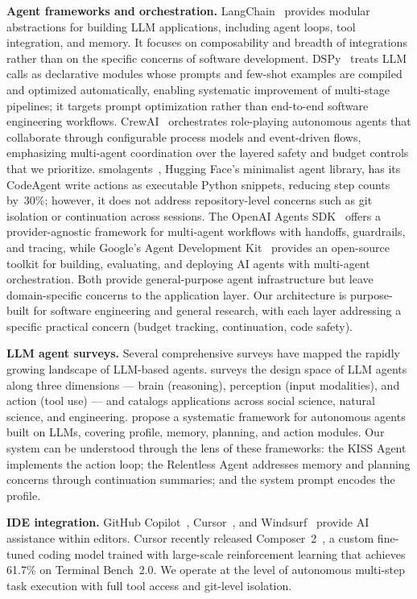 \documentclass{article}
\begin{document}
\textbf{Agent frameworks and orchestration.} LangChain~\citep{langchain2022} provides modular abstractions for building LLM applications, including agent loops, tool integration, and memory. It focuses on composability and breadth of integrations rather than on the specific concerns of software development.  DSPy~\citep{khattab2024dspy} treats LLM calls as declarative modules whose prompts and few-shot examples are compiled and optimized automatically, enabling systematic improvement of multi-stage pipelines; it targets prompt optimization rather than end-to-end software engineering workflows.  CrewAI~\citep{crewai2024} orchestrates role-playing autonomous agents that collaborate through configurable process models and event-driven flows, emphasizing multi-agent coordination over the layered safety and budget controls that we prioritize.  smolagents~\citep{smolagents2025}, Hugging Face's minimalist agent library, has its CodeAgent write actions as executable Python snippets, reducing step counts by~30\%; however, it does not address repository-level concerns such as git isolation or continuation across sessions.  The OpenAI Agents SDK~\citep{openaiagentssdk2025} offers a provider-agnostic framework for multi-agent workflows with handoffs, guardrails, and tracing, while Google's Agent Development Kit~\citep{googleadk2025} provides an open-source toolkit for building, evaluating, and deploying AI agents with multi-agent orchestration.  Both provide general-purpose agent infrastructure but leave domain-specific concerns to the application layer.  Our architecture is purpose-built for software engineering and general research, with each layer addressing a specific practical concern (budget tracking, continuation, code safety).

\textbf{LLM agent surveys.} Several comprehensive surveys have mapped the rapidly growing landscape of LLM-based agents. \citet{xi2023rise} surveys the design space of LLM agents along three dimensions --- brain (reasoning), perception (input modalities), and action (tool use) --- and catalogs applications across social science, natural science, and engineering. \citet{wang2024survey} propose a systematic framework for autonomous agents built on LLMs, covering profile, memory, planning, and action modules.  Our system can be understood through the lens of these frameworks: the KISS Agent implements the action loop; the Relentless Agent addresses memory and planning concerns through continuation summaries; and the system prompt encodes the profile.

\textbf{IDE integration.} GitHub Copilot~\citep{copilot2021}, Cursor~\citep{cursor2024}, and Windsurf~\citep{windsurf2024} provide AI assistance within editors. Cursor recently released Composer~2~\citep{cursor2026composer2}, a custom fine-tuned coding model trained with large-scale reinforcement learning that achieves 61.7\% on Terminal Bench~2.0. We operate at the level of autonomous multi-step task execution with full tool access and git-level isolation.
\end{document}
